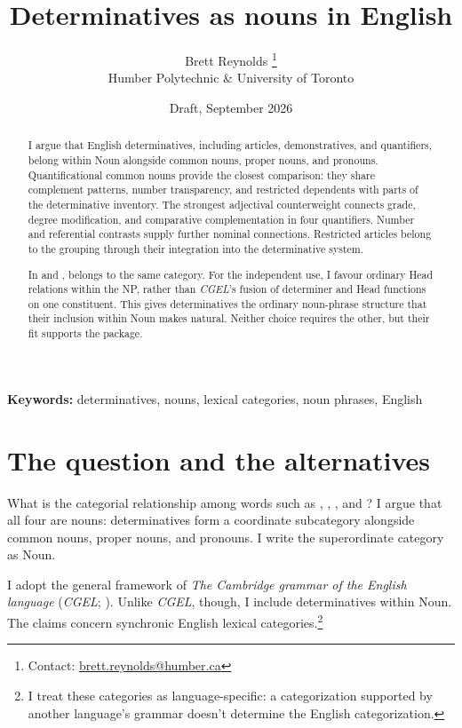 \documentclass[12pt]{article}
\title{Determinatives as nouns in English}
\author{Brett Reynolds \orcidlink{0000-0003-0073-7195}%
\thanks{Contact: \href{mailto:brett.reynolds@humber.ca}{brett.reynolds@humber.ca}}\\
Humber Polytechnic \& University of Toronto}
\date{Draft, September 2026}
\begin{document}
\maketitle

\begin{abstract}
I argue that English determinatives, including articles, demonstratives, and quantifiers, belong within Noun alongside common nouns, proper nouns, and pronouns. Quantificational common nouns provide the closest comparison: they share complement patterns, number transparency, and restricted dependents with parts of the determinative inventory. The strongest adjectival counterweight connects grade, degree modification, and comparative complementation in four quantifiers. Number and referential contrasts supply further nominal connections. Restricted articles belong to the grouping through their integration into the determinative system.

In  and ,  belongs to the same category. For the independent use, I favour ordinary Head relations within the NP, rather than \textit{CGEL}'s fusion of determiner and Head functions on one constituent. This gives determinatives the ordinary noun-phrase structure that their inclusion within Noun makes natural. Neither choice requires the other, but their fit supports the package.
\end{abstract}

\noindent\textbf{Keywords:} determinatives, nouns, lexical categories, noun phrases, English

\section{The question and the alternatives}\label{sec:intro}

What is the categorial relationship among words such as , , , and ? I argue that all four are nouns: determinatives form a coordinate subcategory alongside common nouns, proper nouns, and pronouns. I write the superordinate category as Noun.

I adopt the general framework of \textit{The Cambridge grammar of the English language} (\textit{CGEL}; \citealt{huddleston2002}). Unlike \textit{CGEL}, though, I include determinatives within Noun. The claims concern synchronic English lexical categories.\footnote{I treat these categories as language-specific: a categorization supported by another language's grammar doesn't determine the English categorization.}
\end{document}
